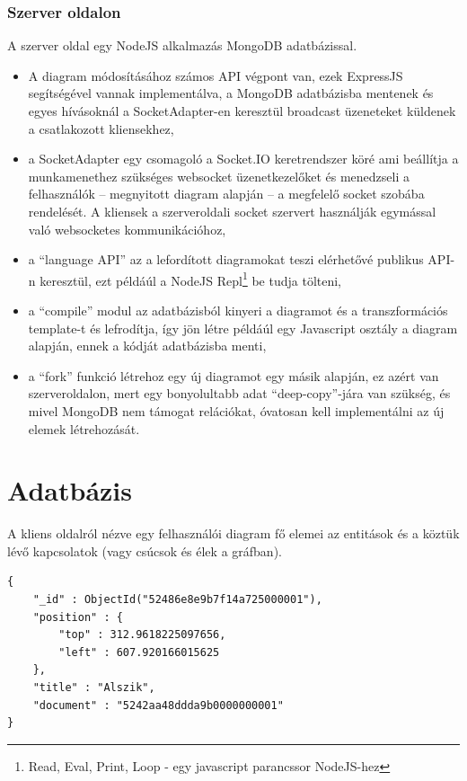 \subsubsection{Szerver oldalon}

A szerver oldal egy NodeJS alkalmazás MongoDB adatbázissal.   

\begin{itemize}
\item A diagram módosításához számos API végpont van, ezek ExpressJS segítségével vannak implementálva, a MongoDB adatbázisba mentenek és egyes hívásoknál a SocketAdapter-en keresztül broadcast üzeneteket küldenek a csatlakozott kliensekhez,
\item a SocketAdapter egy csomagoló a Socket.IO keretrendszer köré ami beállítja a munkamenethez szükséges websocket üzenetkezelőket és menedzseli a felhasználók -- megnyitott diagram alapján -- a megfelelő socket szobába rendelését. A kliensek a szerveroldali socket szervert használják egymással való websocketes kommunikációhoz, 
\item a ``language API'' az a lefordított diagramokat teszi elérhetővé publikus API-n keresztül, ezt példáúl a NodeJS Repl\footnote{Read, Eval, Print, Loop - egy javascript parancssor NodeJS-hez} be tudja tölteni,
\item a ``compile'' modul az adatbázisból kinyeri a diagramot és a transzformációs template-t és lefrodítja, így jön létre példáúl egy Javascript osztály a diagram alapján, ennek a kódját adatbázisba menti, 
\item a ``fork'' funkció létrehoz egy új diagramot egy másik alapján, ez azért van szerveroldalon, mert egy bonyolultabb adat ``deep-copy''-jára van szükség, és mivel MongoDB nem támogat relációkat, óvatosan kell implementálni az új elemek létrehozását.
\end{itemize}

\section{Adatbázis}

A kliens oldalról nézve egy felhasználói diagram fő elemei az entitások és a köztük lévő kapcsolatok (vagy csúcsok és élek a gráfban). 


\begin{lstlisting}[label=entity,caption=Egy gráf csúcs -- vagy entitás -- reprezentálása az adatbázisban]
{
    "_id" : ObjectId("52486e8e9b7f14a725000001"),
    "position" : {
        "top" : 312.9618225097656,
        "left" : 607.920166015625
    },
    "title" : "Alszik",
    "document" : "5242aa48ddda9b0000000001"
}
\end{lstlisting}

